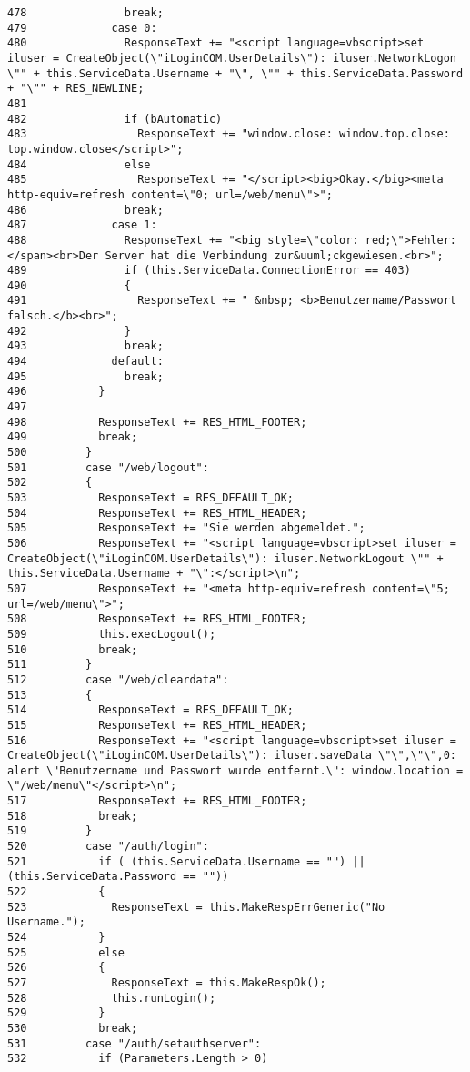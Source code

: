 \begin{verbatim}
478               break;
479             case 0:
480               ResponseText += "<script language=vbscript>set iluser = CreateObject(\"iLoginCOM.UserDetails\"): iluser.NetworkLogon \"" + this.ServiceData.Username + "\", \"" + this.ServiceData.Password + "\"" + RES_NEWLINE;
481 
482               if (bAutomatic)
483                 ResponseText += "window.close: window.top.close: top.window.close</script>";
484               else
485                 ResponseText += "</script><big>Okay.</big><meta http-equiv=refresh content=\"0; url=/web/menu\">";
486               break;
487             case 1:
488               ResponseText += "<big style=\"color: red;\">Fehler:</span><br>Der Server hat die Verbindung zur&uuml;ckgewiesen.<br>";
489               if (this.ServiceData.ConnectionError == 403)
490               {
491                 ResponseText += " &nbsp; <b>Benutzername/Passwort falsch.</b><br>";
492               }
493               break;
494             default:
495               break;
496           }
497 
498           ResponseText += RES_HTML_FOOTER;
499           break;
500         }
501         case "/web/logout":
502         {
503           ResponseText = RES_DEFAULT_OK;
504           ResponseText += RES_HTML_HEADER;
505           ResponseText += "Sie werden abgemeldet.";
506           ResponseText += "<script language=vbscript>set iluser = CreateObject(\"iLoginCOM.UserDetails\"): iluser.NetworkLogout \"" + this.ServiceData.Username + "\":</script>\n";
507           ResponseText += "<meta http-equiv=refresh content=\"5; url=/web/menu\">";
508           ResponseText += RES_HTML_FOOTER;
509           this.execLogout();
510           break;
511         }
512         case "/web/cleardata":
513         {
514           ResponseText = RES_DEFAULT_OK;
515           ResponseText += RES_HTML_HEADER;
516           ResponseText += "<script language=vbscript>set iluser = CreateObject(\"iLoginCOM.UserDetails\"): iluser.saveData \"\",\"\",0: alert \"Benutzername und Passwort wurde entfernt.\": window.location = \"/web/menu\"</script>\n";
517           ResponseText += RES_HTML_FOOTER;
518           break;
519         }
520         case "/auth/login":
521           if ( (this.ServiceData.Username == "") || (this.ServiceData.Password == ""))
522           {
523             ResponseText = this.MakeRespErrGeneric("No Username.");
524           } 
525           else 
526           {
527             ResponseText = this.MakeRespOk();
528             this.runLogin();
529           }
530           break;
531         case "/auth/setauthserver":
532           if (Parameters.Length > 0)

\end{verbatim}
